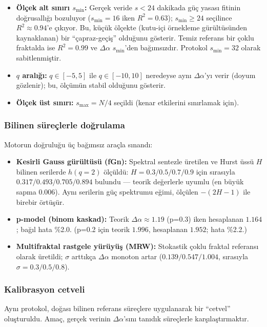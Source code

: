 \documentclass[11pt,a4paper]{article}
\newcommand{\Dal}{\Delta\alpha}
\begin{document}
\begin{itemize}[leftmargin=1.4em]
  \item \textbf{Ölçek alt sınırı $s_{\min}$:} Gerçek veride $s<24$ dakikada
        güç yasası fitinin doğrusallığı bozuluyor
        ($s_{\min}=16$ iken $R^2=0.63$); $s_{\min}\ge 24$ seçilince
        $R^2\approx 0.94$'e çıkıyor. Bu, küçük ölçekte (kutu-içi örnekleme
        gürültüsünden kaynaklanan) bir ``çapraz-geçiş'' olduğunu gösterir.
        Temiz referans bir çoklu fraktalda ise $R^2=0.99$ ve $\Dal$
        $s_{\min}$'den bağımsızdır. Protokol $s_{\min}=32$ olarak sabitlenmiştir.
  \item \textbf{$q$ aralığı:} $q\in[-5,5]$ ile $q\in[-10,10]$ neredeyse aynı
        $\Dal$'yı verir (doyum gözlenir); bu, ölçümün stabil olduğunu gösterir.
  \item \textbf{Ölçek üst sınırı:} $s_{\max}=N/4$ seçildi (kenar etkilerini
        sınırlamak için).
\end{itemize}

\subsubsection{Bilinen süreçlerle doğrulama}
Motorun doğruluğu üç bağımsız araçla sınandı:
\begin{itemize}[leftmargin=1.4em]
  \item \textbf{Kesirli Gauss gürültüsü (fGn):} Spektral sentezle üretilen ve
        Hurst üssü $H$ bilinen serilerde $h(q{=}2)$ ölçüldü: $H=0.3/0.5/0.7/0.9$
        için sırasıyla $0.317/0.493/0.705/0.894$ bulundu --- teorik değerlerle
        uyumlu (en büyük sapma $0.006$). Aynı serilerin güç spektrumu eğimi,
        ölçülen $-(2H-1)$ ile birebir örtüşür.
  \item \textbf{p-model (binom kaskad):} Teorik $\Dal \approx 1.19$ (p=0.3)
        iken hesaplanan $1.164$; bağıl hata \%2.0. (p=0.2 için teorik $1.996$,
        hesaplanan $1.952$; hata \%2.2.)
  \item \textbf{Multifraktal rastgele yürüyüş (MRW):} Stokastik çoklu fraktal
        referansı olarak üretildi; $\sigma$ arttıkça $\Dal$ monoton artar
        ($0.139/0.547/1.004$, sırasıyla $\sigma=0.3/0.5/0.8$).
\end{itemize}

\subsubsection{Kalibrasyon cetveli}
Aynı protokol, doğası bilinen referans süreçlere uygulanarak bir ``cetvel''
oluşturuldu. Amaç, gerçek verinin $\Dal$'sını tanıdık süreçlerle
karşılaştırmaktır.
\end{document}
